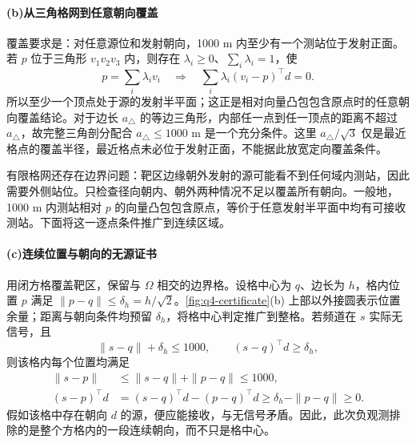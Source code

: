 \paragraph{\textbf{(b)}\hspace{0.2em}从三角格网到任意朝向覆盖}
覆盖要求是：对任意源位和发射朝向，1000 m 内至少有一个测站位于发射正面。若 $p$ 位于三角形 $v_1v_2v_3$ 内，则存在 $\lambda_i\ge0$、$\sum_i\lambda_i=1$，使
\begin{equation}\label{eq:q4-triangle}
 p=\sum_i\lambda_i v_i
 \quad\Longrightarrow\quad
 \sum_i\lambda_i(v_i-p)^\top d=0.
\end{equation}
所以至少一个顶点处于源的发射半平面；这正是相对向量凸包包含原点时的任意朝向覆盖结论。对于边长 $a_{\triangle}$ 的等边三角形，内部任一点到任一顶点的距离不超过 $a_{\triangle}$，故完整三角剖分配合 $a_{\triangle}\le1000$ m 是一个充分条件。这里 $a_{\triangle}/\sqrt3$ 仅是最近格点的覆盖半径，最近格点未必位于发射正面，不能据此放宽定向覆盖条件。

有限格网还存在边界问题：靶区边缘朝外发射的源可能看不到任何域内测站，因此需要外侧站位。只检查径向朝内、朝外两种情况不足以覆盖所有朝向。一般地，1000 m 内测站相对 $p$ 的向量凸包包含原点，等价于任意发射半平面中均有可接收测站。下面将这一逐点条件推广到连续区域。

\paragraph{\textbf{(c)}\hspace{0.2em}连续位置与朝向的无源证书}
用闭方格覆盖靶区，保留与 $\Omega$ 相交的边界格。设格中心为 $q$、边长为 $h$，格内位置 $p$ 满足 $\|p-q\|\le\delta_h=h/\sqrt2$。\cref{fig:q4-certificate}(b) 上部以外接圆表示位置余量；距离与朝向条件均预留 $\delta_h$，将格中心判定推广到整格。若频道在 $s$ 实际无信号，且
\begin{equation}\label{eq:q4-cell}
 \|s-q\|+\delta_h\le1000,\qquad (s-q)^\top d\ge\delta_h,
\end{equation}
则该格内每个位置均满足
\begin{equation}\label{eq:q4-cell-proof}
 \begin{aligned}
 \|s-p\|&\le\|s-q\|+\|p-q\|\le1000,\\
 (s-p)^\top d&=(s-q)^\top d-(p-q)^\top d\ge\delta_h-\|p-q\|\ge0.
 \end{aligned}
\end{equation}
假如该格中存在朝向 $d$ 的源，便应能接收，与无信号矛盾。因此，此次负观测排除的是整个方格内的一段连续朝向，而不只是格中心。

